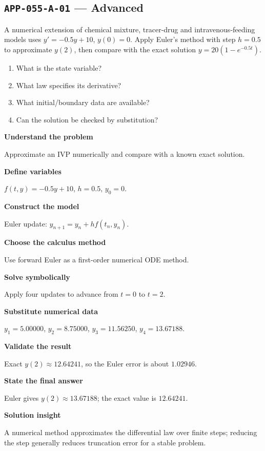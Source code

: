 \documentclass[11pt]{book}
\newcommand{\pid}[1]{\texttt{#1}}
\begin{document}
\subsection*{\pid{APP-055-A-01} — Advanced}
\begin{problembox}
A numerical extension of chemical mixture, tracer-drug and intravenous-feeding models uses $y'=-0.5y+10$, $y(0)=0$. Apply Euler's method with step $h=0.5$ to approximate $y(2)$, then compare with the exact solution $y=20(1-e^{-0.5t})$.
\end{problembox}
\begin{promptbox}\begin{enumerate}
\item What is the state variable?
\item What law specifies its derivative?
\item What initial/boundary data are available?
\item Can the solution be checked by substitution?
\end{enumerate}\end{promptbox}
\begin{solutionbox}
\textbf{Understand the problem}\par Approximate an IVP numerically and compare with a known exact solution.\par\medskip
\textbf{Define variables}\par $f(t,y)=-0.5y+10$, $h=0.5$, $y_0=0$.\par\medskip
\textbf{Construct the model}\par Euler update: $y_{n+1}=y_n+h f(t_n,y_n)$.\par\medskip
\textbf{Choose the calculus method}\par Use forward Euler as a first-order numerical ODE method.\par\medskip
\textbf{Solve symbolically}\par Apply four updates to advance from $t=0$ to $t=2$.\par\medskip
\textbf{Substitute numerical data}\par $y_1=5.00000$, $y_2=8.75000$, $y_3=11.56250$, $y_4=13.67188$.\par\medskip
\textbf{Validate the result}\par Exact $y(2)\approx 12.64241$, so the Euler error is about $1.02946$.\par\medskip
\textbf{State the final answer}\par Euler gives $y(2)\approx 13.67188$; the exact value is $12.64241$.\par\medskip
\textbf{Solution insight}\par A numerical method approximates the differential law over finite steps; reducing the step generally reduces truncation error for a stable problem.\par\medskip
\end{solutionbox}
\end{document}
